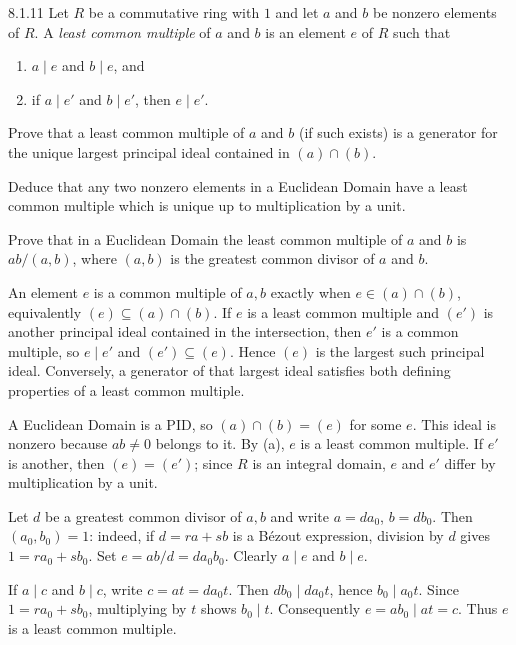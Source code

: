 \documentclass[11pt,oneside]{article}
\begin{document}
\begin{exercise}{8.1.11}
Let $R$ be a commutative ring with $1$ and let $a$ and $b$ be nonzero elements of $R$. A \emph{least common multiple} of $a$ and $b$ is an element $e$ of $R$ such that
\begin{enumerate}[label=(\roman*),leftmargin=2.5em,itemsep=0.2em,topsep=0.35em]
\item $a\mid e$ and $b\mid e$, and
\item if $a\mid e'$ and $b\mid e'$, then $e\mid e'$.
\end{enumerate}
\begin{exercisesubparts}
\item Prove that a least common multiple of $a$ and $b$ (if such exists) is a generator for the unique largest principal ideal contained in $(a)\cap(b)$.
\item Deduce that any two nonzero elements in a Euclidean Domain have a least common multiple which is unique up to multiplication by a unit.
\item Prove that in a Euclidean Domain the least common multiple of $a$ and $b$ is $ab/(a,b)$, where $(a,b)$ is the greatest common divisor of $a$ and $b$.
\end{exercisesubparts}
\end{exercise}
\begin{solution}
\begin{exercisesubparts}
\item An element $e$ is a common multiple of $a,b$ exactly when $e\in(a)\cap(b)$, equivalently $(e)\subseteq(a)\cap(b)$. If $e$ is a least common multiple and $(e')$ is another principal ideal contained in the intersection, then $e'$ is a common multiple, so $e\mid e'$ and $(e')\subseteq(e)$. Hence $(e)$ is the largest such principal ideal. Conversely, a generator of that largest ideal satisfies both defining properties of a least common multiple.
\item A Euclidean Domain is a PID, so $(a)\cap(b)=(e)$ for some $e$. This ideal is nonzero because $ab\neq0$ belongs to it. By (a), $e$ is a least common multiple. If $e'$ is another, then $(e)=(e')$; since $R$ is an integral domain, $e$ and $e'$ differ by multiplication by a unit.
\item Let $d$ be a greatest common divisor of $a,b$ and write $a=da_0$, $b=db_0$. Then $(a_0,b_0)=1$: indeed, if $d=ra+sb$ is a B\'ezout expression, division by $d$ gives $1=ra_0+sb_0$. Set $e=ab/d=da_0b_0$. Clearly $a\mid e$ and $b\mid e$.

If $a\mid c$ and $b\mid c$, write $c=at=da_0t$. Then $db_0\mid da_0t$, hence $b_0\mid a_0t$. Since $1=ra_0+sb_0$, multiplying by $t$ shows $b_0\mid t$. Consequently $e=ab_0\mid at=c$. Thus $e$ is a least common multiple.
\end{exercisesubparts}
\end{solution}
\end{document}

